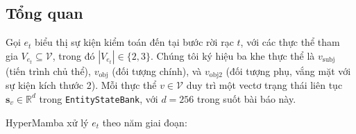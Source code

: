 \documentclass[letterpaper,twocolumn,10pt]{article}
\begin{document}


\subsection{Tổng quan}
\label{sec:overview}

Gọi $e_t$ biểu thị sự kiện kiểm toán đến tại bước rời rạc $t$, với các thực thể tham gia $V_{e_t} \subseteq \mathcal{V}$, trong đó $|V_{e_t}| \in \{2, 3\}$. Chúng tôi ký hiệu ba khe thực thể là $v_{\text{subj}}$ (tiến trình chủ thể), $v_{\text{obj}}$ (đối tượng chính), và $v_{\text{obj2}}$ (đối tượng phụ, vắng mặt với sự kiện kích thước 2). Mỗi thực thể $v \in \mathcal{V}$ duy trì một vectơ trạng thái liên tục $\mathbf{s}_v \in \mathbb{R}^d$ trong \texttt{EntityStateBank}, với $d = 256$ trong suốt bài báo này.

HyperMamba xử lý $e_t$ theo năm giai đoạn:
\end{document}
